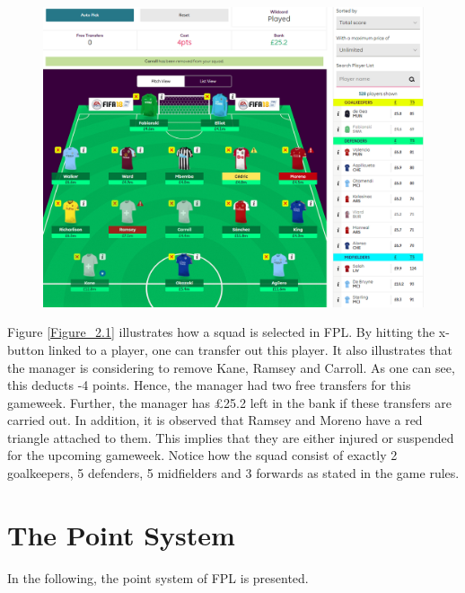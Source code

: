 \begin{figure}[H]
\centering
\includegraphics[scale=0.35]{fig/fantasyteam1.png}
\label{Figure_2.1}
\label{fig:fantasy_bilde}
\end{figure}

Figure \ref{Figure_2.1} illustrates how a squad is selected in FPL. By hitting the x-button linked to a player, one can transfer out this player. It also illustrates that the manager is considering to remove Kane, Ramsey and Carroll. As one can see, this deducts -4 points. Hence, the manager had two free transfers for this gameweek. Further, the manager has \pounds 25.2 left in the bank if these transfers are carried out. In addition, it is observed that Ramsey and Moreno have a red triangle attached to them. This implies that they are either injured or suspended for the upcoming gameweek. Notice how the squad consist of exactly 2 goalkeepers, 5 defenders, 5 midfielders and 3 forwards as stated in the game rules. 


\section{The Point System} \label{point_system}
In the following, the point system of FPL is presented. 

